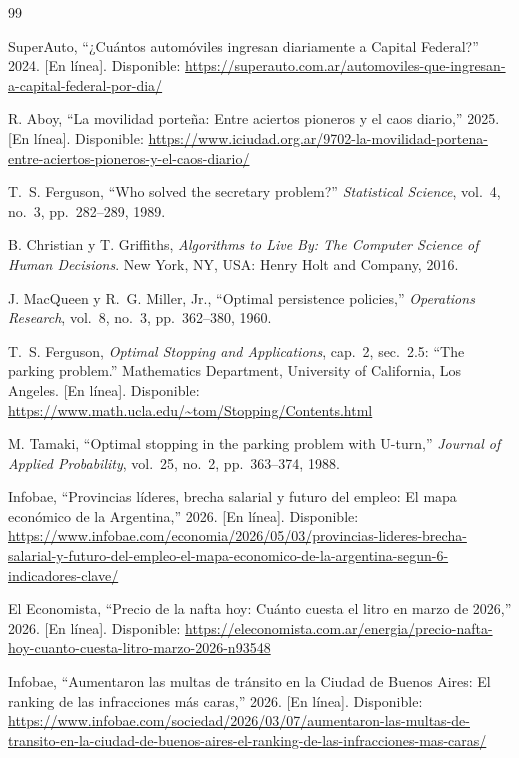 \documentclass[conference,a4paper]{IEEEtran}
\begin{document}
\begin{thebibliography}{99}

SuperAuto, ``¿Cuántos automóviles ingresan diariamente a Capital Federal?'' 2024. [En línea]. Disponible: \url{https://superauto.com.ar/automoviles-que-ingresan-a-capital-federal-por-dia/}

R. Aboy, ``La movilidad porteña: Entre aciertos pioneros y el caos diario,'' 2025. [En línea]. Disponible: \url{https://www.iciudad.org.ar/9702-la-movilidad-portena-entre-aciertos-pioneros-y-el-caos-diario/}

T.~S. Ferguson, ``Who solved the secretary problem?'' \textit{Statistical Science}, vol.~4, no.~3, pp.~282--289, 1989.

B. Christian y T. Griffiths, \textit{Algorithms to Live By: The Computer Science of Human Decisions}. New York, NY, USA: Henry Holt and Company, 2016.

J. MacQueen y R.~G. Miller, Jr., ``Optimal persistence policies,'' \textit{Operations Research}, vol.~8, no.~3, pp.~362--380, 1960.

T.~S. Ferguson, \textit{Optimal Stopping and Applications}, cap.~2, sec.~2.5: ``The parking problem.'' Mathematics Department, University of California, Los Angeles. [En línea]. Disponible: \url{https://www.math.ucla.edu/~tom/Stopping/Contents.html}

M. Tamaki, ``Optimal stopping in the parking problem with U-turn,'' \textit{Journal of Applied Probability}, vol.~25, no.~2, pp.~363--374, 1988.

Infobae, ``Provincias líderes, brecha salarial y futuro del empleo: El mapa económico de la Argentina,'' 2026. [En línea]. Disponible: \url{https://www.infobae.com/economia/2026/05/03/provincias-lideres-brecha-salarial-y-futuro-del-empleo-el-mapa-economico-de-la-argentina-segun-6-indicadores-clave/}

El Economista, ``Precio de la nafta hoy: Cuánto cuesta el litro en marzo de 2026,'' 2026. [En línea]. Disponible: \url{https://eleconomista.com.ar/energia/precio-nafta-hoy-cuanto-cuesta-litro-marzo-2026-n93548}

Infobae, ``Aumentaron las multas de tránsito en la Ciudad de Buenos Aires: El ranking de las infracciones más caras,'' 2026. [En línea]. Disponible: \url{https://www.infobae.com/sociedad/2026/03/07/aumentaron-las-multas-de-transito-en-la-ciudad-de-buenos-aires-el-ranking-de-las-infracciones-mas-caras/}


\end{thebibliography}
\end{document}
